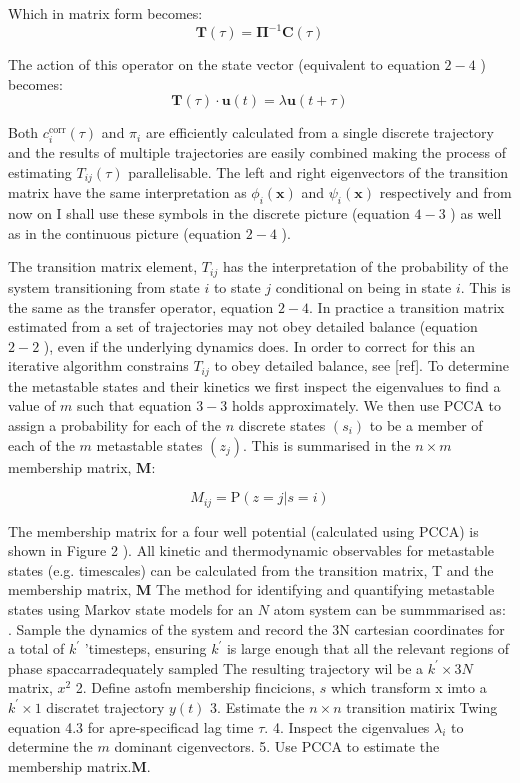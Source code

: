 Which in matrix form becomes: 
\begin{equation}\label{eqn:tran_def}
\mathbf{T}(\tau)=\mathbf{\Pi}^{-1} \mathbf{C}(\tau)
\end{equation}

The action of this operator on the state vector (equivalent to equation $2-4$ ) becomes:
\begin{equation}
\mathbf{T}(\tau) \cdot \mathbf{u}(t)=\lambda \mathbf{u}(t+\tau)
\end{equation}
 
 Both $c_{i}^{\text {corr}}(\tau)$ and $\pi_{i}$ are efficiently calculated from a single discrete trajectory and the results of multiple trajectories are easily combined making the process of estimating $T_{i j}(\tau)$ parallelisable. The left and right eigenvectors of the transition matrix have the same interpretation as $\phi_{i}(\mathbf{x})$ and $\psi_{i}(\mathbf{x})$ respectively and from now on I shall use these symbols in the discrete picture (equation $4-3$ ) as well as in the continuous picture (equation $2-4$ ).

The transition matrix element, $T_{i j}$ has the interpretation of the probability of the system transitioning from state $i$ to state $j$ conditional on being in state $i .$ This is the same as the transfer operator, equation $2-4 .$ In practice a transition matrix estimated from a set of trajectories may not obey detailed balance (equation $2-2$ ), even if
the underlying dynamics does. In order to correct for this an iterative algorithm constrains $T_{i j}$ to obey detailed balance, see [ref].
To determine the metastable states and their kinetics we first inspect the eigenvalues to find a value of $m$ such that equation $3-3$ holds approximately. We then use PCCA to assign a probability for each of the $n$ discrete states $\left(s_{i}\right)$ to be a member of each of the $m$ metastable states $\left(z_{j}\right)$. This is summarised in the $n \times m$ membership matrix, $\mathbf{M}$:

\[
M_{i j}=\mathrm{P}(z=j | s=i)
\]

The membership matrix for a four well potential (calculated using PCCA) is shown in Figure 2 ). All kinetic and thermodynamic observables for metastable states (e.g. timescales) can be calculated from the transition matrix, T and the membership matrix, $\mathbf{M}$
The method for identifying and quantifying metastable states using Markov state models for an $N$ atom system can be summmarised as:
. Sample the dynamics of the system and record the $3 \mathrm{N}$ cartesian coordinates for a total of $k^{\prime}$ 'timesteps, ensuring $k^{\prime}$ is large enough that all the relevant regions of phase spaccarradequately sampled The resulting trajectory wil be a $k^{\prime} \times 3 N$ matrix, $x^{2}$
2. Define astofn membership fincicions, $s$ which transform x imto a $k^{\prime} \times 1$ discratet trajectory $y(t)$
3. Estimate the $n \times n$ transition matirix Twing equation 4.3 for apre-specificad lag time $\tau$.
4. Inspect the cigenvalues $\lambda_{i}$ to determine the $m$ dominant cigenvectors.
5. Use PCCA to estimate the membership matrix.$\mathbf{M}$.

